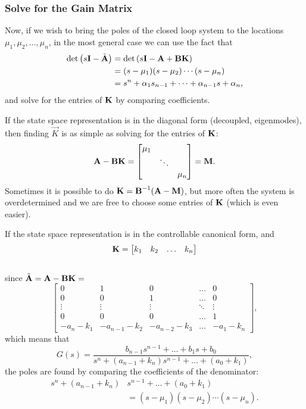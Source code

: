 \subsubsection{Solve for the Gain Matrix}

Now, if we wish to bring the poles of the closed loop system to the locations \(\mu_1, \mu_2, \ldots, \mu_n\), in the most general case we can use the fact that
\begin{align*}
	\det\left(s\bm{\mathrm{I}} - \tilde{\bm{\mathrm{A}}}\right)
		&= \det\left(s\bm{\mathrm{I}} - \bm{\mathrm{A}} + \bm{\mathrm{B}}\bm{\mathrm{K}}\right) \\
		&= (s - \mu_1)(s - \mu_2) \cdots (s - \mu_n) \\
		&= s^n + \alpha_1 s_{n-1} + \dots + \alpha_{n-1} s + \alpha_n,
\end{align*}
and solve for the entries of \(\bm{\mathrm{K}}\) by comparing coefficients.

If the state space representation is in the diagonal form (decoupled, eigenmodes), then finding \(\vec{K}\) is as simple as solving for the entries of \(\bm{\mathrm{K}}\):
\[
	\bm{\mathrm{A}} - \bm{\mathrm{B}} \bm{\mathrm{K}} =
	\begin{bmatrix}
		\mu_1 \\
		& \ddots \\
		& & \mu_n
	\end{bmatrix}
	= \bm{\mathrm{M}}.
\]
Sometimes it is possible to do \(\bm{\mathrm{K}} = \bm{\mathrm{B}}^{-1} (\bm{\mathrm{A}} - \bm{\mathrm{M}})\), but more often the system is overdetermined and we are free to choose some entries of \(\bm{\mathrm{K}}\) (which is even easier).

If the state space representation is in the controllable canonical form, and 
\[
	\bm{\mathrm{K}} = \begin{bmatrix} k_1 & k_2 & \ldots & k_n \end{bmatrix}
\] \\
since \(\tilde{\bm{\mathrm{A}}} = \bm{\mathrm{A}} - \bm{\mathrm{B}}\bm{\mathrm{K}} = \)
{\small
	\[
		\begin{bmatrix}
			0 & 1 & 0 & \dots & 0 \\
			0 & 0 & 1 & \dots & 0 \\
			\vdots & \vdots & \vdots & \ddots & \vdots \\
			0 & 0 & 0 & \dots & 1 \\
			-a_n -k_1 & -a_{n-1} - k_2 & -a_{n-2} - k_3& \dots & -a_1 - k_n
		\end{bmatrix},
	\]
}
which means that
\[
	G(s) = \frac{
		b_{n-1} s^{n-1} + \dots + b_1 s + b_0
	}{
		s^n + (a_{n-1} + k_n) s^{n-1} + \dots + (a_0 + k_1)
	},
\]
the poles are found by comparing the coefficients of the denominator:
\begin{align*}
	s^n + (a_{n-1} + k_n) &s^{n-1} + \dots + (a_0 + k_1) \\
		&= (s - \mu_1)(s - \mu_2) \cdots (s - \mu_n).
\end{align*}

